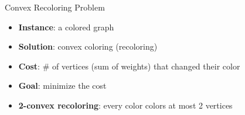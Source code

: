 \begin{frame}{Convex Recoloring Problem}
\begin{itemize}


\item
\textbf{Instance}: a colored graph

\pause\item
\textbf{Solution}: convex coloring (recoloring)

\pause\item
\textbf{Cost}: \# of vertices {\tiny(sum of weights)} that changed their color

\pause\item
\textbf{Goal}: minimize the cost


\end{itemize}
\pause

\begin{itemize}
\pause\item
\textbf{2-convex recoloring}: every color colors at most 2 vertices 
\end{itemize}


\end{frame}
